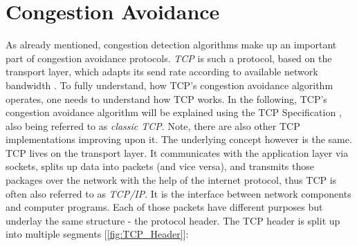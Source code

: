\documentclass[a4paper,conference]{IEEEtran}
\begin{document}
\section{Congestion Avoidance}
\label{sec:ca}
As already mentioned, congestion detection algorithms make up an important part of congestion avoidance protocols. \textit{TCP} is such a protocol, based on the transport layer, which adapts its send rate according to available network bandwidth \cite{1209197,jacobson1992tcp}. To fully understand, how TCP's congestion avoidance algorithm operates, one needs to understand how TCP works. In the following, TCP's congestion avoidance algorithm will be explained using the TCP Specification \cite{ietf-tcpm-rfc793bis-16,postel1981transmission}, also being referred to as \textit{classic TCP}. Note, there are also other TCP implementations improving upon it. The underlying concept however is the same.
\\TCP lives on the transport layer. It communicates with the application layer via sockets, splits up data into packets (and vice versa), and transmits those packages over the network with the help of the internet protocol, thus TCP is often also referred to as \textit{TCP/IP}. It is the interface between network components and computer programs. Each of those packets have different purposes but underlay the same structure - the protocol header. The TCP header is split up into multiple segments [\autoref{fig:TCP_Header}]:
\end{document}
